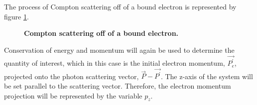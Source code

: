 The process of Compton scattering off of a bound electron is represented by
figure \ref{fig:compton_scatter_bound_electron}.
\begin{figure}[t!]
  \begin{center}
  \end{center}
  \caption{\textbf{Compton scattering off of a bound electron.}}
  \label{fig:compton_scatter_bound_electron}
\end{figure}
Conservation of energy and momentum will again be used to determine the 
quantity of interest, which in this case is the initial electron momentum, 
$\vec{P_e^{'}}$, projected onto the photon scattering vector, 
$\vec{P} - \vec{P^{'}}$. The z-axis of the system will be set parallel to the
scattering vector. Therefore, the electron momentum projection will be 
represented by the variable $p_z$.

